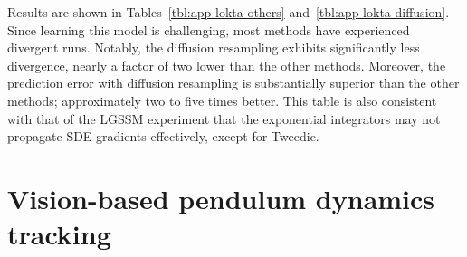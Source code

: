 \documentclass{article}
\begin{document}
\begin{table}[]
\end{table}

Results are shown in Tables~\ref{tbl:app-lokta-others} and~\ref{tbl:app-lokta-diffusion}. 
Since learning this model is challenging, most methods have experienced divergent runs. 
Notably, the diffusion resampling exhibits significantly less divergence, nearly a factor of two lower than the other methods. 
Moreover, the prediction error with diffusion resampling is substantially superior than the other methods; approximately two to five times better.
This table is also consistent with that of the LGSSM experiment that the exponential integrators may not propagate SDE gradients effectively, except for Tweedie. 

\section{Vision-based pendulum dynamics tracking}
\label{app:pendulum}
\end{document}
